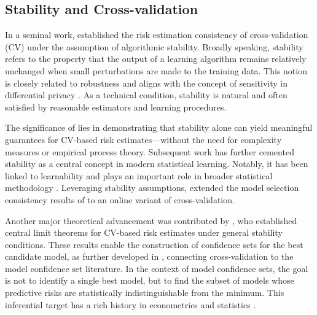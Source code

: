 \documentclass[11pt]{article}
\theoremstyle{plain}
\begin{document}
\subsection{Stability and Cross-validation}
In a seminal work, \cite{bousquet2002stability} established the risk estimation consistency of cross-validation (CV) under the assumption of algorithmic stability. Broadly speaking, stability refers to the property that the output of a learning algorithm remains relatively unchanged when small perturbations are made to the training data. This notion is closely related to robustness \citep{huber2011robust} and aligns with the concept of sensitivity in differential privacy \citep{dwork2009differential,dwork2014algorithmic}. As a technical condition, stability is natural and often satisfied by reasonable estimators and learning procedures.

The significance of \cite{bousquet2002stability} lies in demonstrating that stability alone can yield meaningful guarantees for CV-based risk estimates---without the need for complexity measures or empirical process theory. Subsequent work has further cemented stability as a central concept in modern statistical learning. Notably, it has been linked to learnability \citep{shalev2010learnability,wang2016learning} and plays an important role in broader statistical methodology \citep{yu2013stability,yu2020veridical}. Leveraging stability assumptions, \cite{zhang2023online} extended the model selection consistency results of \cite{yang2007consistency} to an online variant of cross-validation.

Another major theoretical advancement was contributed by \cite{bayle2020cross,austern2020}, who established central limit theorems for CV-based risk estimates under general stability conditions. These results enable the construction of confidence sets for the best candidate model, as further developed in \cite{lei2020cross,kissel2022high}, connecting cross-validation to the model confidence set literature. In the context of model confidence sets, the goal is not to identify a single best model, but to find the subset of models whose predictive risks are statistically indistinguishable from the minimum. This inferential target has a rich history in econometrics and statistics \citep{jiang2008fence,hansen2011model,gunes2012confidence,ferrari2015confidence}.
\end{document}
